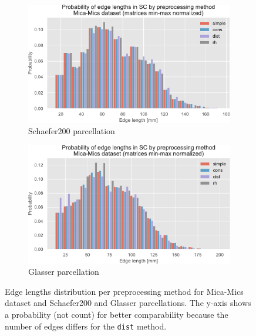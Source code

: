 \begin{figure}[p]
\begin{subfigure}{\textwidth}
      \begin{center}
    \includegraphics[width=\textwidth]{images/nootebook_generated/sc_comparison/schaefer/5/0.25/Probability_of_edge_lengths_in_SC_by_preprocessing_method_Mica-Mics_dataset_(matrices_min-max_normalized).pdf}
  \end{center}
  \caption{Schaefer200 parcellation}
  \label{fig:edge_lengths_schaefer}
\end{subfigure}

\bigskip

\begin{subfigure}{\textwidth}
      \begin{center}
    \includegraphics[width=\textwidth]{images/nootebook_generated/sc_comparison/MNI-HCP-MMP1/5/0.25/Probability_of_edge_lengths_in_SC_by_preprocessing_method_Mica-Mics_dataset_(matrices_min-max_normalized).pdf}
  \end{center}
  \caption{Glasser parcellation}
  \label{fig:edge_lengths_glasser}
\end{subfigure}
\caption[Edge lengths distribution per preprocessing method]{Edge lengths distribution per preprocessing method for Mica-Mics dataset and Schaefer200 and Glasser parcellations. The y-axis shows a probability (not count) for better comparability because the number of edges differs for the \texttt{dist} method.}
\label{fig:edge_lengths}
\end{figure}

